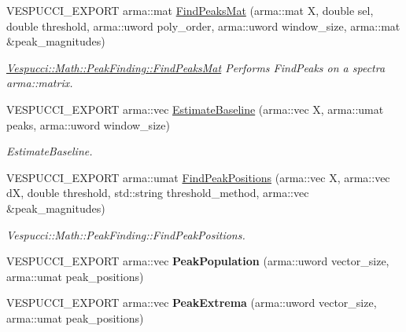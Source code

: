 \begin{DoxyCompactItemize}
\item 
V\+E\+S\+P\+U\+C\+C\+I\+\_\+\+E\+X\+P\+O\+RT arma\+::mat \hyperlink{namespace_vespucci_1_1_math_1_1_peak_finding_a9f22a184fb69fb6ab32757fdd19e1ae7}{Find\+Peaks\+Mat} (arma\+::mat X, double sel, double threshold, arma\+::uword poly\+\_\+order, arma\+::uword window\+\_\+size, arma\+::mat \&peak\+\_\+magnitudes)
\begin{DoxyCompactList}\small\item\em \hyperlink{namespace_vespucci_1_1_math_1_1_peak_finding_a9f22a184fb69fb6ab32757fdd19e1ae7}{Vespucci\+::\+Math\+::\+Peak\+Finding\+::\+Find\+Peaks\+Mat} Performs Find\+Peaks on a spectra arma\+::matrix. \end{DoxyCompactList}\item 
V\+E\+S\+P\+U\+C\+C\+I\+\_\+\+E\+X\+P\+O\+RT arma\+::vec \hyperlink{namespace_vespucci_1_1_math_1_1_peak_finding_a33b834ac6082132d53ec8b307f16e1bd}{Estimate\+Baseline} (arma\+::vec X, arma\+::umat peaks, arma\+::uword window\+\_\+size)
\begin{DoxyCompactList}\small\item\em Estimate\+Baseline. \end{DoxyCompactList}\item 
V\+E\+S\+P\+U\+C\+C\+I\+\_\+\+E\+X\+P\+O\+RT arma\+::umat \hyperlink{namespace_vespucci_1_1_math_1_1_peak_finding_a502c529617f35fd20d1e11aca2a03a28}{Find\+Peak\+Positions} (arma\+::vec X, arma\+::vec dX, double threshold, std\+::string threshold\+\_\+method, arma\+::vec \&peak\+\_\+magnitudes)
\begin{DoxyCompactList}\small\item\em Vespucci\+::\+Math\+::\+Peak\+Finding\+::\+Find\+Peak\+Positions. \end{DoxyCompactList}\item 
V\+E\+S\+P\+U\+C\+C\+I\+\_\+\+E\+X\+P\+O\+RT arma\+::vec {\bfseries Peak\+Population} (arma\+::uword vector\+\_\+size, arma\+::umat peak\+\_\+positions)\hypertarget{namespace_vespucci_1_1_math_1_1_peak_finding_ab4743c0a36c5000975f1c9f300e101e0}{}\label{namespace_vespucci_1_1_math_1_1_peak_finding_ab4743c0a36c5000975f1c9f300e101e0}

\item 
V\+E\+S\+P\+U\+C\+C\+I\+\_\+\+E\+X\+P\+O\+RT arma\+::vec {\bfseries Peak\+Extrema} (arma\+::uword vector\+\_\+size, arma\+::umat peak\+\_\+positions)\hypertarget{namespace_vespucci_1_1_math_1_1_peak_finding_a2106329f1df30b0aca62ccb130494c88}{}\label{namespace_vespucci_1_1_math_1_1_peak_finding_a2106329f1df30b0aca62ccb130494c88}

\end{DoxyCompactItemize}


